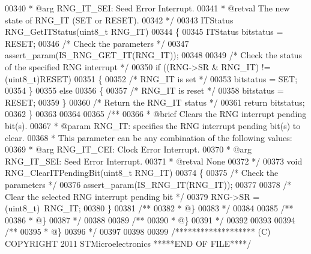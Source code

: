 \begin{DoxyCode}
00340 \textcolor{comment}{  *            @arg RNG\_IT\_SEI: Seed Error Interrupt.                   }
00341 \textcolor{comment}{  * @retval The new state of RNG\_IT (SET or RESET).}
00342 \textcolor{comment}{  */}
00343 ITStatus RNG_GetITStatus(uint8\_t RNG\_IT)
00344 \{
00345   ITStatus bitstatus = RESET;
00346   \textcolor{comment}{/* Check the parameters */}
00347   assert_param(IS\_RNG\_GET\_IT(RNG\_IT));
00348 
00349   \textcolor{comment}{/* Check the status of the specified RNG interrupt */}
00350   \textcolor{keywordflow}{if} ((RNG->SR & RNG\_IT) != (uint8\_t)RESET)
00351   \{
00352     \textcolor{comment}{/* RNG\_IT is set */}
00353     bitstatus = SET;
00354   \}
00355   \textcolor{keywordflow}{else}
00356   \{
00357     \textcolor{comment}{/* RNG\_IT is reset */}
00358     bitstatus = RESET;
00359   \}
00360   \textcolor{comment}{/* Return the RNG\_IT status */}
00361   \textcolor{keywordflow}{return} bitstatus;
00362 \}
00363 
00364 
00365 \textcolor{comment}{/**}
00366 \textcolor{comment}{  * @brief  Clears the RNG interrupt pending bit(s).}
00367 \textcolor{comment}{  * @param  RNG\_IT: specifies the RNG interrupt pending bit(s) to clear.}
00368 \textcolor{comment}{  *          This parameter can be any combination of the following values:}
00369 \textcolor{comment}{  *            @arg RNG\_IT\_CEI: Clock Error Interrupt.}
00370 \textcolor{comment}{  *            @arg RNG\_IT\_SEI: Seed Error Interrupt.}
00371 \textcolor{comment}{  * @retval None}
00372 \textcolor{comment}{  */}
00373 \textcolor{keywordtype}{void} RNG_ClearITPendingBit(uint8\_t RNG\_IT)
00374 \{
00375   \textcolor{comment}{/* Check the parameters */}
00376   assert_param(IS\_RNG\_IT(RNG\_IT));
00377 
00378   \textcolor{comment}{/* Clear the selected RNG interrupt pending bit */}
00379   RNG->SR = (uint8\_t)~RNG\_IT;
00380 \}
00381 \textcolor{comment}{/**}
00382 \textcolor{comment}{  * @\}}
00383 \textcolor{comment}{  */}
00384 
00385 \textcolor{comment}{/**}
00386 \textcolor{comment}{  * @\}}
00387 \textcolor{comment}{  */}
00388 
00389 \textcolor{comment}{/**}
00390 \textcolor{comment}{  * @\}}
00391 \textcolor{comment}{  */}
00392 
00393 
00394 \textcolor{comment}{/**}
00395 \textcolor{comment}{  * @\}}
00396 \textcolor{comment}{  */}
00397 
00398 
00399 \textcolor{comment}{/******************* (C) COPYRIGHT 2011 STMicroelectronics *****END OF FILE****/}
\end{DoxyCode}
